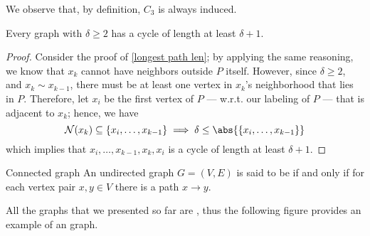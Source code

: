 \documentclass[a4paper, 12pt]{report}
\begin{document}
    We observe that, by definition, $C_3$ is always induced.

    \begin{framedprop}[label={min deg 2}]{}
        Every graph with $\delta \ge 2$ has a cycle of length at least $\delta + 1$.
    \end{framedprop}

    \begin{proof}
        Consider the proof of \cref{longest path len}; by applying the same reasoning, we know that $x_k$ cannot have neighbors outside $P$ itself. However, since $\delta \ge 2$, and $x_k \sim x_{k - 1}$, there must be at least one vertex in $x_k$'s neighborhood that lies in $P$. Therefore, let $x_i$ be the first vertex of $P$ --- w.r.t. our labeling of $P$ --- that is adjacent to $x_k$; hence, we have $$\mathcal N (x_k) \subseteq \{x_i, \ldots, x_{k - 1}\} \implies \delta \le \abs{\{x_i, \ldots, x_{k - 1}\}}$$ which implies that $x_i, \ldots, x_{k - 1}, x_k, x_i$ is a cycle of length at least $\delta + 1$.
    \end{proof}

    \begin{frameddefn}{Connected graph}
        An undirected graph $G = (V, E)$ is said to be  if and only if for each vertex pair $x, y \in V$ there is a path $x \to y$.
    \end{frameddefn}

    All the graphs that we presented so far are , thus the following figure provides an example of an  graph.

    \begin{figure}[H]
        \centering
    \end{figure}
\end{document}
